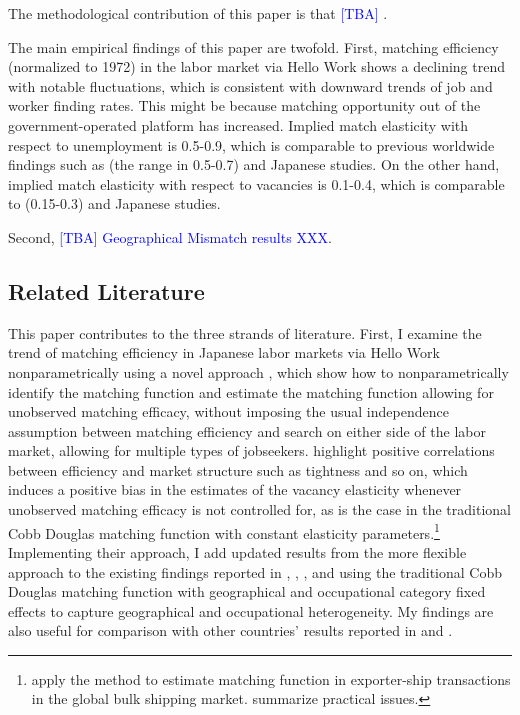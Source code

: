 \documentclass[12pt]{article}
\begin{document}
The methodological contribution of this paper is that \textcolor{blue}{[TBA] }.

The main empirical findings of this paper are twofold.
First, matching efficiency (normalized to 1972) in the labor market via  Hello Work shows a declining trend with notable fluctuations, which is consistent with downward trends of job and worker finding rates.
This might be because matching opportunity out of the government-operated platform has increased. 
Implied match elasticity with respect to unemployment is 0.5-0.9, which is comparable to previous worldwide findings such as \cite{petrongolo2001looking} (the range in 0.5-0.7) and Japanese studies.
On the other hand, implied match elasticity with respect to vacancies is 0.1-0.4, which is comparable to \cite{lange2020beyond} (0.15-0.3) and Japanese studies.

Second, \textcolor{blue}{[TBA] Geographical Mismatch results XXX}.


\subsection{Related Literature}
This paper contributes to the three strands of literature.
First, I examine the trend of matching efficiency in Japanese labor markets via Hello Work nonparametrically using a novel approach \citep{lange2020beyond}, which show how to nonparametrically identify the matching function and estimate the matching function allowing for unobserved matching efficacy, without imposing the usual independence assumption between matching efficiency and search on either side of the labor market, allowing for multiple types of jobseekers.
\cite{lange2020beyond} highlight positive correlations between efficiency and market structure such as tightness and so on, which induces a positive bias in the estimates of the vacancy elasticity whenever unobserved matching efficacy is not controlled for, as is the case in the traditional Cobb Douglas matching function with constant elasticity parameters.\footnote{\cite{brancaccio2020geography,brancaccio2023search} apply the method to estimate matching function in exporter-ship transactions in the global bulk shipping market. \cite{brancaccio2020guide} summarize practical issues.} 
Implementing their approach, I add updated results from the more flexible approach to the existing findings reported in \cite{kano2005estimating}, \cite{kambayashi2006vacancy}, \cite{sasaki2008matching}, and \cite{higashi2018spatial} using the traditional Cobb Douglas matching function with geographical and occupational category fixed effects to capture geographical and occupational heterogeneity.
My findings are also useful for comparison with other countries' results reported in \cite{bernstein2022matching} and \cite{petrongolo2001looking}.
\end{document}
